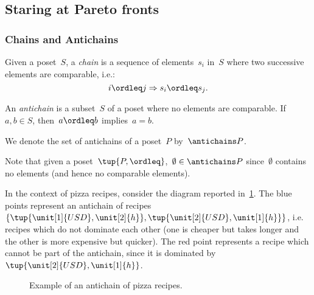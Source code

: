 \subsection{Staring at Pareto fronts}
\label{sec:chains-antichains}
\subsubsection{Chains and Antichains} 


\begin{definition}
\label{def:chain}
Given a poset~$S$, a \emph{chain} is a sequence of elements~${s_i}$ in~$S$ where two successive elements are comparable, i.e.:
\begin{equation}
    i \ordleq j \Rightarrow s_i \ordleq s_j.
\end{equation}
\end{definition}

\begin{definition}
\label{def:antichain}
An \emph{antichain} is a subset~$S$ of a poset where no elements are comparable. If~$a,b \in S$, then~$a \ordleq b$ implies~$a=b$.
\end{definition}
\begin{remark}
We denote the set of antichains of a poset~$P$ by~$\antichains P$.
\end{remark}
\begin{remark}
Note that given a poset~$\tup{P,\ordleq}$,~$\emptyset \in \antichains P$ since~$\emptyset$ contains no elements (and hence no comparable elements).
\end{remark}

In the context of pizza recipes, consider the diagram reported in~\cref{fig:antichain}. The blue points represent an antichain of recipes~$\{\tup{\unit[1]{USD},\unit[2]{h}},\tup{\unit[2]{USD},\unit[1]{h}}\}$, i.e. recipes which do not dominate each other (one is cheaper but takes longer and the other is more expensive but quicker). The red point represents a recipe which cannot be part of the antichain, since it is dominated by~$\tup{\unit[2]{USD},\unit[1]{h}}$. 

\begin{figure}[h!]
\begin{center}
\end{center}
\caption{Example of an antichain of pizza recipes. \label{fig:antichain}}
\end{figure}


